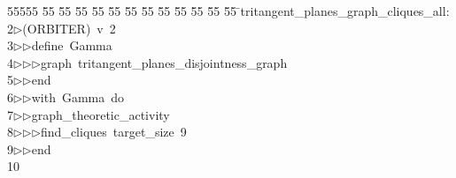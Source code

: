 %
%
\begin{tabbing}
55555 \= 55 \= 55 \= 55 \= 55 \= 55 \= 55 \= 55 \= 55 \= 55 \= 55 \= 55 \= 55 \= \>tritangent\_planes\_graph\_cliques\_all:\\[0pt]
2\>$\triangleright$\>(ORBITER)\ v\ 2\ \\[0pt]
3\>$\triangleright$\>$\triangleright$\>define\ Gamma\ \\[0pt]
4\>$\triangleright$\>$\triangleright$\>$\triangleright$\>graph\ tritangent\_planes\_disjointness\_graph\ \\[0pt]
5\>$\triangleright$\>$\triangleright$\>end\ \\[0pt]
6\>$\triangleright$\>$\triangleright$\>with\ Gamma\ do\ \\[0pt]
7\>$\triangleright$\>$\triangleright$\>graph\_theoretic\_activity\ \\[0pt]
8\>$\triangleright$\>$\triangleright$\>$\triangleright$\>find\_cliques\ target\_size\ 9\ \\[0pt]
9\>$\triangleright$\>$\triangleright$\>end\\[0pt]
10\>\end{tabbing}
